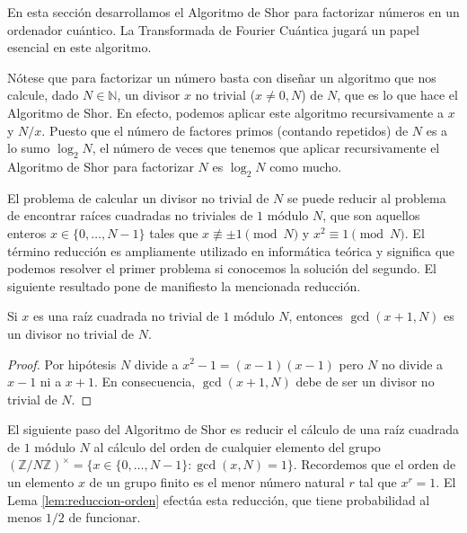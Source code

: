 \documentclass{article}
\begin{document}
En esta sección desarrollamos el Algoritmo de Shor para factorizar números en un ordenador cuántico. La Transformada de Fourier Cuántica jugará un papel esencial en este algoritmo.

\begin{remark} \label{rem:shor}
Nótese que para factorizar un número basta con diseñar un algoritmo que nos calcule, dado $N \in \mathbb{N}$, un divisor $x$ no trivial ($x \ne 0, N$) de $N$, que es lo que hace el Algoritmo de Shor. En efecto, podemos aplicar este algoritmo recursivamente a $x$ y $N/x$. Puesto que el número de factores primos (contando repetidos) de $N$ es a lo sumo $\log_2 N$, el número de veces que tenemos que aplicar recursivamente el Algoritmo de Shor para factorizar $N$ es $\log_2 N$ como mucho.
\end{remark}


El problema de calcular un divisor no trivial de $N$ se puede reducir al problema de encontrar raíces cuadradas no triviales de $1$ módulo $N$, que son aquellos enteros $x \in \{0, \ldots, N-1\}$ tales que $x \not \equiv \pm 1 \pmod{N}$ y $x^2 \equiv 1 \pmod{N}$. El término reducción es ampliamente utilizado en informática teórica y significa que podemos resolver el primer problema si conocemos la solución del segundo. El siguiente resultado pone de manifiesto la mencionada reducción.

\begin{lemma}
  Si $x$ es una raíz cuadrada no trivial de $1$ módulo $N$, entonces $\gcd(x+1, N)$ es un divisor no trivial de $N$. 
\end{lemma}
\begin{proof}
  Por hipótesis $N$ divide a $x^2 - 1 = (x-1)(x-1)$ pero $N$ no divide a $x-1$ ni a $x+1$. En consecuencia, $\gcd(x+1, N)$ debe de ser un divisor no trivial de $N$.
\end{proof}

El siguiente paso del Algoritmo de Shor es reducir el cálculo de una raíz cuadrada de $1$ módulo $N$ al cálculo del orden de cualquier elemento del grupo $\left(\mathbb{Z}/ N \mathbb{Z}\right)^{\times} = \{x \in \{0, \ldots, N-1\} : \gcd(x,N) = 1\}$. Recordemos que el orden de un elemento $x$ de un grupo finito es el menor número natural $r$ tal que $x^r = 1$. El Lema \ref{lem:reduccion-orden} efectúa esta reducción, que tiene probabilidad al menos $1/2$ de funcionar.
\end{document}
